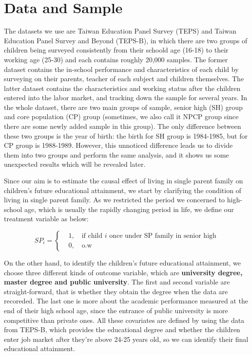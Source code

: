 \documentclass[]{AEA}
\begin{document}
\section{Data and Sample} %

    The datasets we use are Taiwan Education Panel Survey (TEPS) and Taiwan Education Panel Survey and Beyond (TEPS-B), in which there are two groups of children being surveyed consistently from their schoold age (16-18) to their working age (25-30) and each contains roughly 20,000 samples. The former dataset contains the in-school performance and characteristics of each child by surveying on their parents, teacher of each subject and children themselves. The latter dataset contains the characteristics and working status after the children entered into the labor market, and tracking down the sample for several years.  In the whole dataset, there are two main groups of sample, senior high (SH) group and core population (CP) group (sometimes, we also call it NPCP group since there are some newly added sample in this group).  The only difference between these two groups is the year of birth: the birth for SH group is 1984-1985, but for CP group is 1988-1989.  However, this unnoticed difference leads us to divide them into two groups and perform the same analysis, and it shows us some unexpected results which will be revealed later.

    Since our aim is to estimate the causal effect of living in single parent family on children's future educational attainment, we start by clarifying the condition of living in single parent family.  As we restricted the period we concerned to high-school age, which is usually the rapidly changing period in life, we define our treatment variable as below:

    \[
        \textit{SP}_i =
        \left\{\begin{aligned}
        &1,\quad\text{if child $i$ once under SP family in senior high} \\
        &0,\quad\text{o.w}
        \end{aligned}\right.
    \]

    On the other hand, to identify the children's future educational attainment, we choose three different kinds of outcome variable, which are \textbf{university degree, master degree and public university}.   The first and second variable are straight-forward, that is whether they obtain the degree when the data are recoreded.  The last one is more about the academic performance measured at the end of their high school age, since the entrance of public university is more competitive than private ones.  All these covariates are defined by using the data from TEPS-B, which provides the educational degree and whether the children enter job market after they're above 24-25 years old, so we can identify their final educational attainment.  
    
\end{document}
